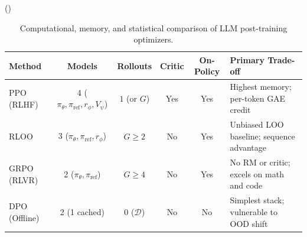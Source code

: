 \documentclass[../../../../master.tex]{subfiles}
\begin{document}
\begin{algorithm}[htbp]
\caption{Unified Post-Training: DPO (Offline) vs.\ GRPO / RLVR (Online Group-Relative)}
\label{alg:align:dpo_grpo}
\Else(){
}
\end{algorithm}

\begin{table}[htbp]
\centering
\caption{Computational, memory, and statistical comparison of LLM post-training optimizers.}
\label{tab:align:complexity}
\begin{tabularx}{\textwidth}{@{}lccccX@{}}
\toprule
\textbf{Method} & \textbf{Models} & \textbf{Rollouts} & \textbf{Critic} & \textbf{On-Policy} & \textbf{Primary Trade-off} \\
\midrule
PPO (RLHF) & 4 ($\pi_\theta, \pi_{\mathrm{ref}}, r_\phi, V_\psi$) & $1$ (or $G$) & Yes & Yes & Highest memory; per-token GAE credit \\
RLOO & 3 ($\pi_\theta, \pi_{\mathrm{ref}}, r_\phi$) & $G \ge 2$ & No & Yes & Unbiased LOO baseline; sequence advantage \\
GRPO (RLVR) & 2 ($\pi_\theta, \pi_{\mathrm{ref}}$) & $G \ge 4$ & No & Yes & No RM or critic; excels on math and code \\
DPO (Offline) & 2 (1 cached) & $0$ ($\mathcal{D}$) & No & No & Simplest stack; vulnerable to OOD shift \\
\bottomrule
\end{tabularx}
\end{table}
\end{document}
